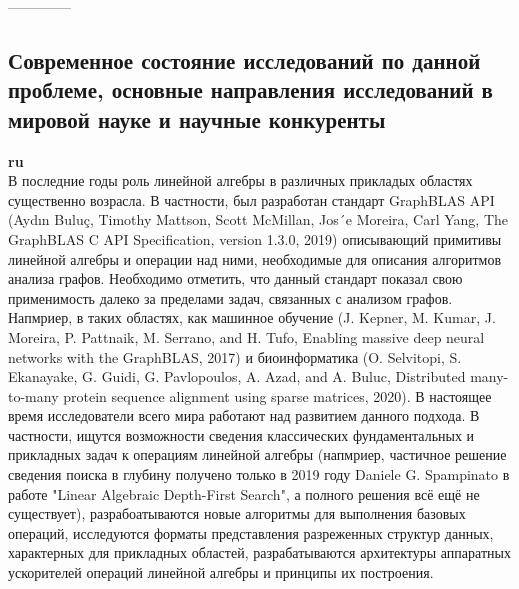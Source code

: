 \documentclass[12pt]{article}  %
\theoremstyle{remark}
\begin{document}
--------------


\subsection{Современное состояние исследований по данной проблеме, основные направления исследований в мировой науке и научные конкуренты}

\textbf{ru}\\

В последние годы роль линейной алгебры в различных прикладых областях существенно возрасла. В частности, был разработан стандарт GraphBLAS API (Aydın Buluç, Timothy Mattson, Scott McMillan, Jos´e Moreira, Carl Yang, The GraphBLAS C API Specification, version 1.3.0, 2019) описывающий примитивы линейной алгебры и операции над ними, необходимые для описания алгоритмов анализа графов. Необходимо отметить, что данный стандарт показал свою применимость далеко за пределами задач, связанных с анализом графов. Напмриер, в таких областях, как машинное обучение (J. Kepner, M. Kumar, J. Moreira, P. Pattnaik, M. Serrano, and H. Tufo, Enabling massive deep neural networks with the GraphBLAS, 2017) и биоинформатика (O. Selvitopi, S. Ekanayake, G. Guidi, G. Pavlopoulos, A. Azad, and A. Buluc, Distributed many-to-many protein sequence alignment using sparse matrices, 2020). В настоящее время исследователи всего мира работают над развитием данного подхода. В частности, ищутся возможности сведения классических фундаментальных и прикладных задач к операциям линейной алгебры (напмриер, частичное решение сведения поиска в глубину получено только в 2019 году Daniele G. Spampinato в работе "Linear Algebraic Depth-First Search", а полного решения всё ещё не существует), разрабоатываются новые алгоритмы для выполнения базовых операций, исследуются форматы представления разреженных структур данных, характерных для прикладных областей, разрабатываются архитектуры аппаратных ускорителей операций линейной алгебры и принципы их построения.
\end{document}
